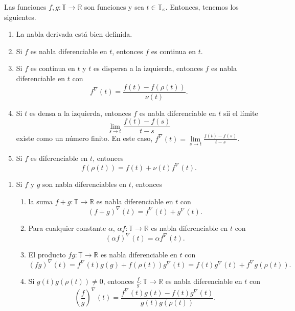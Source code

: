 \begin{frame}
	\begin{theorem}
		Las funciones $f,g\colon\mathds{T}\rightarrow\mathds{R}$ son funciones y sea $t\in\mathds{T}_{\kappa}$. Entonces, tenemos los siguientes.
		\begin{enumerate}
			\item La nabla derivada está bien definida.
			\item Si $f$ es nabla diferenciable en $t$, entonces $f$ es continua en $t$.
			\item Si $f$ es continua en $t$ y $t$ es dispersa a la izquierda, entonces $f$ es nabla diferenciable en $t$ con \[ f^{\nabla}\left(t\right)=\frac{f\left(t\right)-f\left(\rho\left(t\right)\right)}{\nu\left(t\right)}. \]
			\item Si $t$ es densa a la izquierda, entonces $f$ es nabla diferenciable en $t$ sii el límite \[ \lim\limits_{s\to t}\frac{f\left(t\right)-f\left(s\right)}{t-s} \] existe como un número finito. En este caso, $f^{\nabla}\left(t\right)=\lim\limits_{s\to t}\frac{f\left(t\right)-f\left(s\right)}{t-s}$.
			\item Si $f$ es diferenciable en $t$, entonces \[ f\left(\rho\left(t\right)\right)=f\left(t\right)+\nu\left(t\right)f^{\nabla}\left(t\right). \]
		\end{enumerate}
	\end{theorem}
\end{frame}

\begin{frame}%
	\begin{theorem}
	\begin{enumerate}
		\item Si $f$ y $g$ son nabla diferenciables en $t$, entonces
		\begin{enumerate}
			\item la suma $f+g\colon\mathds{T}\rightarrow\mathds{R}$ es nabla diferenciable en $t$ con \[ {\left(f+g\right)}^{\nabla}\left(t\right)=f^{\nabla}\left(t\right)+g^{\nabla}\left(t\right). \]
			\item Para cualquier constante $\alpha$, $\alpha f\colon\mathds{T}\rightarrow\mathds{R}$ es nabla diferenciable en $t$ con \[ {\left(\alpha f\right)}^{\nabla}\left(t\right)=\alpha f^{\nabla}\left(t\right). \]
			\item El producto $fg\colon\mathds{T}\rightarrow\mathds{R}$ es nabla diferenciable en $t$ con \[ {\left(fg\right)}^{\nabla}\left(t\right)=f^{\nabla}\left(t\right)g\left(g\right)+f\left(\rho\left(t\right)\right)g^{\nabla}\left(t\right)=f\left(t\right)g^{\nabla}\left(t\right)+f^{\nabla}g\left(\rho\left(t\right)\right). \]
			\item Si $g\left(t\right)g\left(\rho\left(t\right)\right)\neq0$, entonces $\frac{f}{g}\colon\mathds{T}\rightarrow\mathds{R}$ es nabla diferenciable en $t$ con \[ {\left(\frac{f}{g}\right)}^{\nabla}\left(t\right)=\frac{f^{\nabla}\left(t\right)g\left(t\right)-f\left(t\right)g^{\nabla}\left(t\right)}{g\left(t\right)g\left(\rho\left(t\right)\right)}. \]
		\end{enumerate}
	\end{enumerate}
	\end{theorem}
\end{frame}

